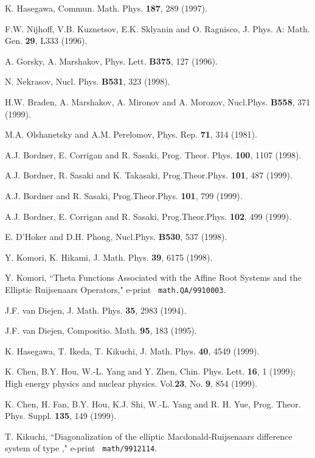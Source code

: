 \documentclass[a4paper,12pt]{article}
\begin{document}
\begin{thebibliography}{99}
  K. Hasegawa, Commun. Math. Phys. \textbf{187}, 289 (1997).

	F.W. Nijhoff, V.B. Kuznetsov, E.K. Sklyanin and O.
Ragnisco, J. Phys. A: Math. Gen. \textbf{29}, L333 (1996).

  A. Gorsky, A. Marshakov, Phys. Lett. \textbf{B375}, 127 (1996).

  N. Nekrasov, Nucl. Phys. \textbf{B531}, 323 (1998).

	H.W. Braden, A. Marshakov, A. Mironov and A. Morozov,
Nucl.Phys. \textbf{B558}, 371 (1999).

  M.A. Olshanetsky and A.M. Perelomov, Phys. Rep.
\textbf{71}, 314 (1981).

  A.J. Bordner, E. Corrigan and R. Sasaki, Prog. Theor. Phys.
\textbf{100}, 1107 (1998).

	A.J. Bordner, R. Sasaki and K. Takasaki, Prog.Theor.Phys.
\textbf{101}, 487 (1999).

	A.J. Bordner and R. Sasaki, Prog.Theor.Phys.
\textbf{101}, 799 (1999).

	A.J. Bordner, E. Corrigan and R. Sasaki, Prog.Theor.Phys.
\textbf{102}, 499 (1999).

  E. D'Hoker and D.H. Phong, Nucl.Phys. \textbf{B530}, 537
(1998).

  Y. Komori, K. Hikami, J. Math. Phys. \textbf{39}, 6175 (1998).

  Y. Komori, ``Theta Functions Associated with the Affine Root
Systems and the Elliptic Ruijsenaars Operators," e-print \texttt{
math.QA/9910003}.

  J.F. van Diejen, J. Math. Phys. \textbf{35}, 2983 (1994).

  J.F. van Diejen, Compositio. Math. \textbf{95}, 183 (1995).

  K. Hasegawa, T. Ikeda, T. Kikuchi, J. Math. Phys.
\textbf{40}, 4549 (1999).

	K. Chen, B.Y. Hou, W.-L. Yang and Y. Zhen, Chin. Phys.
Lett. \textbf{16}, 1 (1999); High energy physics and nuclear physics.
Vol.\textbf{23}, No. \textbf{9}, 854 (1999).

	K. Chen, H. Fan, B.Y. Hou, K.J. Shi, W.-L. Yang and R. H.
Yue, Prog. Theor. Phys. Suppl. \textbf{135}, 149 (1999).

  T. Kikuchi, ``Diagonalization of the elliptic
Macdonald-Ruijsenaars difference system of type \coordHE{}," e-print \texttt{%
math/9912114}.


\end{thebibliography}
\end{document}
